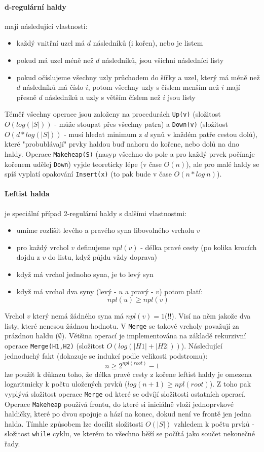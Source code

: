 \documentclass[a4paper]{article}      %
\begin{document}
\paragraph{d-regulární haldy} mají následující vlastnosti:
\begin{itemize}
\item každý vnitřní uzel má $d$ následníků (i kořen), nebo je listem
\item pokud má uzel méně než $d$ následníků, jsou všichni následníci listy
\item pokud očíslujeme všechny uzly průchodem do šířky a uzel, který má méně než $d$ následníků má číslo $i$, potom všechny uzly s číslem menším než $i$ mají přesně $d$ následníků a uzly s větším číslem než $i$ jsou listy
\end{itemize}
Téměř všechny operace jsou založeny na procedurách \verb+Up(v)+ (složitost $O(log(|S|))$ - může stoupat přes všechny patra) a \verb+Down(v)+ (složitost $O(d*log(|S|))$ - musí hledat minimum z $d$ synů v každém patře cestou dolů), které "probublávají" prvky haldou buď nahoru do kořene, nebo dolů na dno haldy. Operace \verb+Makeheap(S)+ (nasyp všechno do pole a pro každý prvek počínaje kořenem udělej \verb+Down+) vyjde teoreticky lépe (v čase $O(n)$), ale pro malé haldy se spíš vyplatí opakování \verb+Insert(x)+ (to pak bude v čase $O(n*log\ n)$).

\paragraph{Leftist halda} je speciální případ 2-regulární haldy s dalšími vlastnostmi:
\begin{itemize}
\item umíme rozlišit levého a pravého syna libovolného vrcholu $v$
\item pro každý vrchol $v$ definujeme $npl(v)$ - délka pravé cesty (po kolika krocích dojdu z $v$ do listu, když půjdu vždy doprava)
\item když má vrchol jednoho syna, je to levý syn
\item když má vrchol dva syny (levý - $u$ a pravý - $v$) potom platí:
\[
npl(u) \geq npl(v)
\]
\end{itemize}
Vrchol $v$ který nemá žádného syna má $npl(v)=1$(!!). Visí na něm jakože dva listy, které nenesou žádnou hodnotu. V \verb+Merge+ se takové vrcholy považují za prázdnou haldu ($\emptyset$).
Většina operací je implementována na základě rekurzivní operace \verb+Merge(H1,H2)+ (složitost $O(log(|H1|+|H2|))$).
Následující jednoduchý fakt (dokazuje se indukcí podle velikosti podstromu):
\[
n \geq 2^{npl(root)}-1 
\]
lze použít k důkazu toho, že délka pravé cesty z kořene leftist haldy je omezena logaritmicky k počtu uložených prvků ($log(n+1) \geq npl(root)$). Z toho pak vyplývá složitost operace \verb+Merge+ od které se odvíjí složitosti ostatních operací. Operace \verb+Makeheap+ používá frontu, do které si iniciálně vloží jednoprvkové haldičky, které po dvou spojuje a hází na konec, dokud není ve frontě jen jedna halda.
Tímhle způsobem lze docílit složitosti $O(|S|)$ vzhledem k počtu prvků - složitost \verb+while+ cyklu,
ve kterém to všechno běží se počítá jako součet nekonečné řady.
\end{document}
